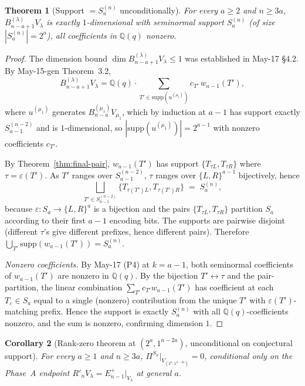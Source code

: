 \documentclass[11pt]{article}
\newtheorem{theorem}{Theorem}
\newtheorem{corollary}[theorem]{Corollary}
\theoremstyle{definition}
\begin{document}
\begin{theorem}[Support $=S_a^{(n)}$ unconditionally]\label{thm:support}
For every $a\ge 2$ and $n\ge 3a$,
$B_{n-a+1}^{(\lambda)}V_\lambda$ is exactly $1$-dimensional with
seminormal support $S_a^{(n)}$ (of size $|S_a^{(n)}|=2^a$),
all coefficients in $\mathbb{Q}(q)$ nonzero.
\end{theorem}

\begin{proof}
The dimension bound $\dim B_{n-a+1}^{(\lambda)}V_\lambda\le 1$ was
established in May-17 \S4.2.  By May-15-gen Theorem~3.2,
\[
   B_{n-a+1}^{(\lambda)}V_\lambda
   =\mathbb{Q}(q)\cdot\sum_{T'\in\mathrm{supp}(u^{(\mu_1)})}c_{T'}\,w_{a-1}(T'),
\]
where $u^{(\mu_1)}$ generates $B_{n-a}^{(\mu_1)}V_{\mu_1}$, which by
induction at $a-1$ has support exactly $S_{a-1}^{(n-2)}$ and is
$1$-dimensional, so $|\mathrm{supp}(u^{(\mu_1)})|=2^{a-1}$ with
nonzero coefficients $c_{T'}$.

By Theorem~\ref{thm:final-pair}, $w_{a-1}(T')$ has support
$\{T_{\tau L},T_{\tau R}\}$ where $\tau=\varepsilon(T')$.  As $T'$
ranges over $S_{a-1}^{(n-2)}$, $\tau$ ranges over $\{L,R\}^{a-1}$
bijectively, hence
\[
   \bigsqcup_{T'\in S_{a-1}^{(n-2)}}\{T_{\tau(T')L},T_{\tau(T')R}\}
   \;=\;S_a^{(n)},
\]
because $\varepsilon:S_a\to\{L,R\}^a$ is a bijection and the pairs
$\{T_{\tau L},T_{\tau R}\}$ partition $S_a$ according to their first
$a-1$ encoding bits.  The supports are pairwise disjoint (different
$\tau$'s give different prefixes, hence different pairs).
Therefore
$\bigcup_{T'}\mathrm{supp}(w_{a-1}(T'))=S_a^{(n)}$.

\emph{Nonzero coefficients.}  By May-17 (P4) at $k=a-1$, both
seminormal coefficients of $w_{a-1}(T')$ are nonzero in
$\mathbb{Q}(q)$.  By the bijection $T'\leftrightarrow\tau$ and the
pair-partition, the linear combination
$\sum_{T'}c_{T'}w_{a-1}(T')$ has coefficient at each
$T_\varepsilon\in S_a$ equal to a single (nonzero) contribution from
the unique $T'$ with $\varepsilon(T')$-matching prefix.  Hence the
support is exactly $S_a^{(n)}$ with all $\mathbb{Q}(q)$-coefficients
nonzero, and the sum is nonzero, confirming dimension $1$.
\end{proof}

\begin{corollary}[Rank-zero theorem at $(2^a,1^{n-2a})$, unconditional
on conjectural support]\label{cor:rank-zero}
For every $a\ge 1$ and $n\ge 3a$,
$\Pi^{S_n}|_{V_{(2^a,1^{n-2a})}}=0$, conditional only on the Phase~A
endpoint $R'_nV_\lambda=E_{n-1}^+|_{V_\lambda}$ at general $a$.
\end{corollary}
\end{document}
